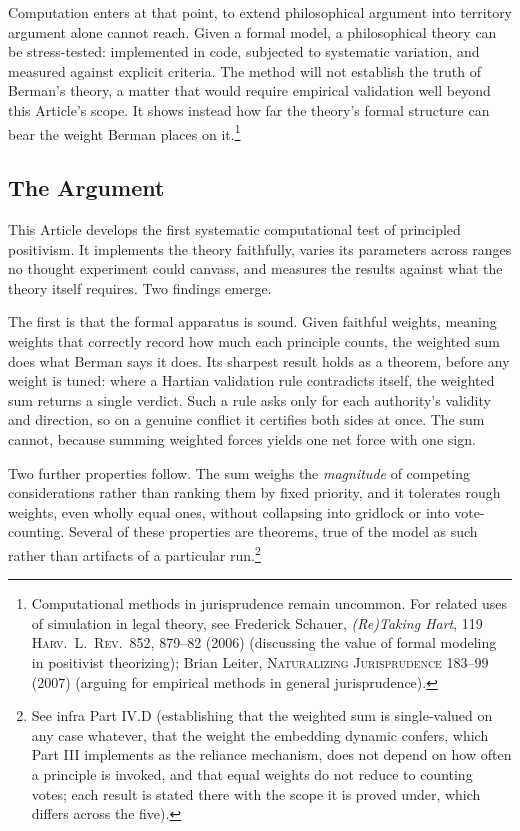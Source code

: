 Computation enters at that point, to extend philosophical argument into
territory argument alone cannot reach. Given a formal model, a philosophical
theory can be stress-tested: implemented in code, subjected to systematic
variation, and measured against explicit criteria. The method will not
establish the truth of Berman's theory, a matter that would require
empirical validation well beyond this Article's scope. It shows instead how
far the theory's formal structure can bear the weight Berman places on
it.\footnote{Computational methods in jurisprudence remain uncommon. For
related uses of simulation in legal theory, see Frederick Schauer,
\textit{(Re)Taking Hart}, 119 \textsc{Harv.\ L.\ Rev.}\ 852, 879--82 (2006)
(discussing the value of formal modeling in positivist theorizing); Brian
Leiter, \textsc{Naturalizing Jurisprudence} 183--99 (2007) (arguing for
empirical methods in general jurisprudence).}

\subsection*{The Argument}

This Article develops the first systematic computational test of principled
positivism. It implements the theory faithfully, varies its parameters
across ranges no thought experiment could canvass, and measures the results
against what the theory itself requires. Two findings emerge.

The first is that the formal apparatus is sound. Given faithful weights,
meaning weights that correctly record how much each principle counts, the
weighted sum does what Berman says it does. Its sharpest result holds as
a theorem, before any weight is tuned: where a Hartian validation rule
contradicts itself, the weighted sum returns a single verdict. Such a rule
asks only for each authority's validity and direction, so on a genuine
conflict it certifies both sides at once. The sum cannot, because summing weighted forces yields one net force with one
sign.

Two further properties follow. The sum weighs the \textit{magnitude} of
competing considerations rather than ranking them by fixed priority, and it
tolerates rough weights, even wholly equal ones, without collapsing into
gridlock or into vote-counting. Several of these properties are theorems,
true of the model as such rather than artifacts of a particular
run.\footnote{See infra Part IV.D (establishing that the weighted sum is single-valued on any case whatever,
that the weight the embedding dynamic confers, which Part III implements as
the reliance mechanism, does not depend on how often a principle is invoked, and that equal weights do not reduce to counting
votes; each result is stated there with the scope it is proved under, which
differs across the five).}

